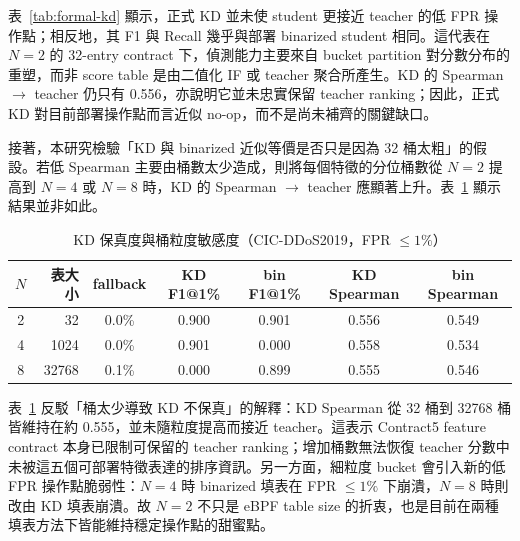 \documentclass[12pt, a4paper, fontset=none]{ctexart}
\begin{document}
表~\ref{tab:formal-kd} 顯示，正式 KD 並未使 student 更接近 teacher 的低 FPR 操作點；相反地，其 F1 與 Recall 幾乎與部署 binarized student 相同。這代表在 $N=2$ 的 32-entry contract 下，偵測能力主要來自 bucket partition 對分數分布的重塑，而非 score table 是由二值化 IF 或 teacher 聚合所產生。KD 的 Spearman $\rightarrow$ teacher 仍只有 0.556，亦說明它並未忠實保留 teacher ranking；因此，正式 KD 對目前部署操作點而言近似 no-op，而不是尚未補齊的關鍵缺口。

接著，本研究檢驗「KD 與 binarized 近似等價是否只是因為 32 桶太粗」的假設。若低 Spearman 主要由桶數太少造成，則將每個特徵的分位桶數從 $N=2$ 提高到 $N=4$ 或 $N=8$ 時，KD 的 Spearman $\rightarrow$ teacher 應顯著上升。表~\ref{tab:kd-granularity} 顯示結果並非如此。

\begin{table}[H]
  \centering
  \caption{KD 保真度與桶粒度敏感度（CIC-DDoS2019，FPR $\leq 1\%$）}
  \label{tab:kd-granularity}
  \small
  \renewcommand{\arraystretch}{1.2}
  \begin{tabular}{c r c c c c c}
    \toprule
    $N$ & \textbf{表大小} & fallback & KD F1@1\% & bin F1@1\% & KD Spearman & bin Spearman \\
    \midrule
    2 & 32 & 0.0\% & 0.900 & 0.901 & 0.556 & 0.549 \\
    4 & 1024 & 0.0\% & 0.901 & 0.000 & 0.558 & 0.534 \\
    8 & 32768 & 0.1\% & 0.000 & 0.899 & 0.555 & 0.546 \\
    \bottomrule
  \end{tabular}
\end{table}

表~\ref{tab:kd-granularity} 反駁「桶太少導致 KD 不保真」的解釋：KD Spearman 從 32 桶到 32768 桶皆維持在約 0.555，並未隨粒度提高而接近 teacher。這表示 Contract5 feature contract 本身已限制可保留的 teacher ranking；增加桶數無法恢復 teacher 分數中未被這五個可部署特徵表達的排序資訊。另一方面，細粒度 bucket 會引入新的低 FPR 操作點脆弱性：$N=4$ 時 binarized 填表在 FPR $\leq 1\%$ 下崩潰，$N=8$ 時則改由 KD 填表崩潰。故 $N=2$ 不只是 eBPF table size 的折衷，也是目前在兩種填表方法下皆能維持穩定操作點的甜蜜點。
\end{document}
